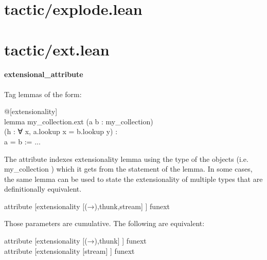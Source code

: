 \documentclass{article}
\begin{document}
\section{tactic/explode.lean}\section{tactic/ext.lean}\paragraph{extensional\_attribute}
\par
Tag lemmas of the form:
\\
\colorbox[RGB]{253,246,227}{\parbox{4.5in}{{{{\color[RGB]{88, 110, 117} @{[}extensionality{]} }}}{{{\color[RGB]{101, 123, 131} 
 }}}\\
{{{\color[RGB]{133, 153, 0} lemma }}}{{{\color[RGB]{101, 123, 131}   }}}{{{\color[RGB]{211, 54, 130} my\_collection.ext }}}{{{\color[RGB]{101, 123, 131}   }}}{{{\color[RGB]{101, 123, 131} (a b : my\_collection)
 }}}\\
{{{\color[RGB]{101, 123, 131}   (h :  }}}{{{\color[RGB]{133, 153, 0} ∀ }}}{{{\color[RGB]{101, 123, 131}  x, a.lookup x  }}}{{{\color[RGB]{181, 137, 0} = }}}{{{\color[RGB]{101, 123, 131}  b.lookup y) :
 }}}\\
{{{\color[RGB]{101, 123, 131}   a  }}}{{{\color[RGB]{181, 137, 0} = }}}{{{\color[RGB]{101, 123, 131}  b  }}}{{{\color[RGB]{181, 137, 0} := }}}{{{\color[RGB]{101, 123, 131}  ...
 }}}\\

}}\par
The attribute indexes extensionality lemma using the type of the
objects (i.e. 
\colorbox[RGB]{253,246,227}{{{{\color[RGB]{101, 123, 131} my\_collection }}}}) which it gets from the statement of
the lemma.  In some cases, the same lemma can be used to state the
extensionality of multiple types that are definitionally equivalent.
\\
\colorbox[RGB]{253,246,227}{\parbox{4.5in}{{{{\color[RGB]{88, 110, 117} attribute {[}extensionality {[}(→),thunk,stream{]} }}}{{{\color[RGB]{101, 123, 131} {]} funext
 }}}\\

}}\par
Those parameters are cumulative. The following are equivalent:
\\
\colorbox[RGB]{253,246,227}{\parbox{4.5in}{{{{\color[RGB]{88, 110, 117} attribute {[}extensionality {[}(→),thunk{]} }}}{{{\color[RGB]{101, 123, 131} {]} funext
 }}}\\
{{{\color[RGB]{88, 110, 117} attribute {[}extensionality {[}stream{]} }}}{{{\color[RGB]{101, 123, 131} {]} funext
 }}}\\

}}\par
\end{document}
